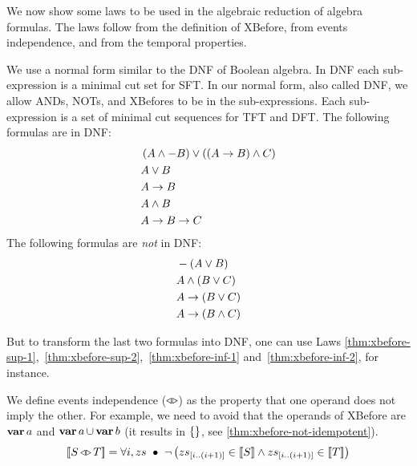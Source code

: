\documentclass[12pt,openright,twoside,a4paper,oldfontcommands,english,brazil,final]{abntex2}
\theoremstyle{theo}
\newcommand{\slice}[3]{\ensuremath #1_{\left[#2..#3\right]}}
\def\varop{\ensuremath\operatorname{\mathbf{var}}}
\newcommand{\var}[1]{\ensuremath\varop #1}
\def\xbeforeop{\ensuremath\rightarrow}
\newcommand{\xbefore}[2]{\ensuremath #1 \xbeforeop #2 }
\def\independenteventsop{\ensuremath\operatorname{\triangleleft\triangleright}}
\newcommand{\independentevents}[2]{\ensuremath #1 \independenteventsop #2}
\def\False{\ensuremath\operatorname{\left\{\right\}}}
\newcommand{\parsin}[1]{\ensuremath\left( #1 \right)}
\def\union{\ensuremath\operatorname{\cup}}
\newcommand{\denote}[1]{\ensuremath\left[\!\left[#1\right]\!\right]}
\begin{document}
We now show some laws to be used in the algebraic reduction of \ac{algebra} formulas.
The laws follow from the definition of \ac{XBefore}, from events independence, and from the temporal properties.

We use a normal form similar to the \ac{DNF} of Boolean algebra.
In \ac{DNF} each sub-expression is a minimal cut set for \ac{SFT}.
In our normal form, also called \ac{DNF}, we allow \acp{AND}, \acp{NOT}, and \acp{XBefore} to be in the sub-expressions.
Each sub-expression is a set of minimal cut sequences for \ac{TFT} and \ac{DFT}.
The following formulas are in \ac{DNF}:
%
\begin{align*}
&\parsin{A \land -B} \lor \parsin{\parsin{\xbefore{A}{B}} \land C}\\
&A \lor B\\
&\xbefore{A}{B}\\
&A \land B\\
&\xbefore{\xbefore{A}{B}}{C}
\end{align*}
%
The following formulas are \emph{not} in \ac{DNF}:
%
\begin{align*}
&-\parsin{A \lor B}\\
&A \land \parsin{B \lor C}\\
&\xbefore{A}{\parsin{B \lor C}}\\
&\xbefore{A}{\parsin{B \land C}}
\end{align*}

\begin{sloppypar}
But to transform the last two formulas into \ac{DNF}, one can use Laws \eqref{thm:xbefore-sup-1},~\eqref{thm:xbefore-sup-2},~\eqref{thm:xbefore-inf-1} and~\eqref{thm:xbefore-inf-2}, for instance.
\end{sloppypar}

We define events independence ($\independenteventsop$) as the property that one operand does not imply the other.
For example, we need to avoid that the operands of \ac{XBefore} are $\var{a}$ and $\var{a} \union \var{b}$ (it results in $\False$, see \eqref{thm:xbefore-not-idempotent}).
%
\begin{equation}
\label{law:independent-events}
\denote{\independentevents{S}{T}} = \forall i, zs ~\bullet~
  \lnot \left(
    \slice{zs}{i}{\left(i+1\right)} \in \denote{S} \land
    \slice{zs}{i}{\left(i+1\right)} \in \denote{T}
  \right)
\end{equation}
\end{document}
